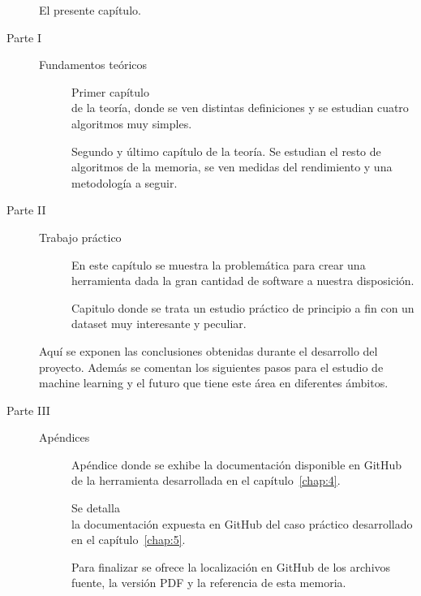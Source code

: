 \begin{description}
\item[] El presente capítulo.

\large
\item[Parte I] Fundamentos teóricos
\normalsize

\begin{description}
\item[] Primer capítulo \\ de la teoría, donde se ven distintas definiciones y se estudian cuatro algoritmos muy simples.

\item[] Segundo y último capítulo de la teoría. Se estudian el resto de algoritmos de la memoria, se ven medidas del rendimiento y una metodología a seguir.
\end{description}

\large
\item[Parte II] Trabajo práctico
\normalsize

\begin{description}
\item[] En este capítulo se muestra la problemática para crear una herramienta dada la gran cantidad de software a nuestra disposición.

\item[] Capitulo donde se trata un estudio práctico de principio a fin con un dataset muy interesante y peculiar.
\end{description}

\item[] Aquí se exponen las conclusiones obtenidas durante el desarrollo del proyecto. Además se comentan los siguientes pasos para el estudio de machine learning y el futuro que tiene este área en diferentes ámbitos.

\pagebreak

\large
\item[Parte III] Apéndices
\normalsize

\begin{description}
\item[] Apéndice donde se exhibe la documentación disponible en GitHub de la herramienta desarrollada en el capítulo~\ref{chap:4}.

\item[] Se detalla \\ la documentación expuesta en GitHub del caso práctico desarrollado en el capítulo~\ref{chap:5}.

\item[] Para finalizar se ofrece la localización en GitHub de los archivos fuente, la versión PDF y la referencia de esta memoria.
\end{description}
\end{description}
